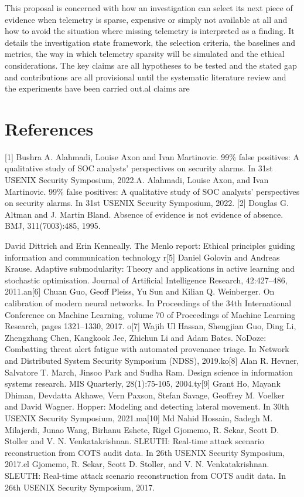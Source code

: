 \documentclass[a4paper,11pt]{article}
\begin{document}
This proposal is concerned with how an investigation can select its next piece of evidence when telemetry is sparse, expensive or simply not available at all and how to avoid the situation where missing telemetry is interpreted as a finding. It details the investigation state framework, the selection criteria, the baselines and metrics, the way in which telemetry sparsity will be simulated and the ethical considerations. The key claims are all hypotheses to be tested and the stated gap and contributions are all provisional until the systematic literature review and the experiments have been carried out.al claims are %
\section*{References}
[1] Bushra A. Alahmadi, Louise Axon and Ivan Martinovic. 99\% false positives: A qualitative study of SOC analysts' perspectives on security alarms. In 31st USENIX Security Symposium, 2022.A. Alahmadi, Louise Axon, and Ivan Martinovic. 99\% false positives: A qualitative study of SOC analysts’ perspectives on security alarms. In 31st USENIX Security Symposium, 2022.
[2] Douglas G. Altman and J. Martin Bland. Absence of evidence is not evidence of absence. BMJ, 311(7003):485, 1995.\par
[3] David Dittrich and Erin Kenneally. The Menlo report: Ethical principles guiding information and communication technology r[5] Daniel Golovin and Andreas Krause. Adaptive submodularity: Theory and applications in active learning and stochastic optimisation. Journal of Artificial Intelligence Research, 42:427–486, 2011.an[6] Chuan Guo, Geoff Pleiss, Yu Sun and Kilian Q. Weinberger. On calibration of modern neural networks. In Proceedings of the 34th International Conference on Machine Learning, volume 70 of Proceedings of Machine Learning Research, pages 1321–1330, 2017. o[7] Wajih Ul Hassan, Shengjian Guo, Ding Li, Zhengzhang Chen, Kangkook Jee, Zhichun Li and Adam Bates. NoDoze: Combatting threat alert fatigue with automated provenance triage. In Network and Distributed System Security Symposium (NDSS), 2019.ko[8] Alan R. Hevner, Salvatore T. March, Jinsoo Park and Sudha Ram. Design science in information systems research. MIS Quarterly, 28(1):75-105, 2004.ty[9] Grant Ho, Mayank Dhiman, Devdatta Akhawe, Vern Paxson, Stefan Savage, Geoffrey M. Voelker and David Wagner. Hopper: Modeling and detecting lateral movement. In 30th USENIX Security Symposium, 2021.ma[10] Md Nahid Hossain, Sadegh M. Milajerdi, Junao Wang, Birhanu Eshete, Rigel Gjomemo, R. Sekar, Scott D. Stoller and V. N. Venkatakrishnan. SLEUTH: Real-time attack scenario reconstruction from COTS audit data. In 26th USENIX Security Symposium, 2017.el Gjomemo, R. Sekar, Scott D. Stoller, and V. N. Venkatakrishnan. SLEUTH: Real-time attack scenario reconstruction from COTS audit data. In 26th USENIX Security Symposium, 2017.\par
\end{document}
